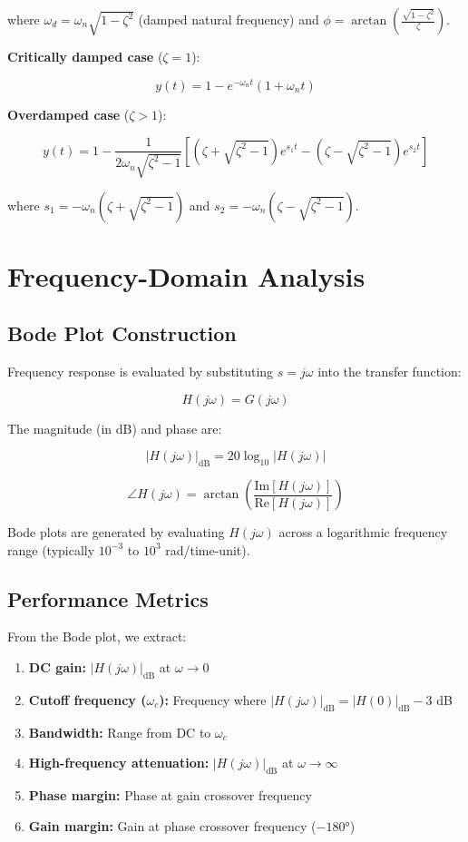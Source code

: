 \documentclass[
]{book}
\providecommand{\tightlist}{%
  \setlength{\itemsep}{0pt}\setlength{\parskip}{0pt}}
\begin{document}
where \(\omega_d = \omega_n\sqrt{1-\zeta^2}\) (damped natural frequency) and \(\phi = \arctan\left(\frac{\sqrt{1-\zeta^2}}{\zeta}\right)\).

\textbf{Critically damped case} (\(\zeta = 1\)):

\[y(t) = 1 - e^{-\omega_n t}(1 + \omega_n t)\]

\textbf{Overdamped case} (\(\zeta > 1\)):

\[y(t) = 1 - \frac{1}{2\omega_n\sqrt{\zeta^2-1}}\left[(\zeta + \sqrt{\zeta^2-1})e^{s_1 t} - (\zeta - \sqrt{\zeta^2-1})e^{s_2 t}\right]\]

where \(s_1 = -\omega_n(\zeta + \sqrt{\zeta^2-1})\) and \(s_2 = -\omega_n(\zeta - \sqrt{\zeta^2-1})\).

\section{Frequency-Domain Analysis}\label{frequency-domain-analysis}

\subsection{Bode Plot Construction}\label{bode-plot-construction}

Frequency response is evaluated by substituting \(s = j\omega\) into the transfer function:

\[H(j\omega) = G(j\omega)\]

The magnitude (in dB) and phase are:

\[|H(j\omega)|_{\text{dB}} = 20\log_{10}|H(j\omega)|\]

\[\angle H(j\omega) = \arctan\left(\frac{\text{Im}[H(j\omega)]}{\text{Re}[H(j\omega)]}\right)\]

Bode plots are generated by evaluating \(H(j\omega)\) across a logarithmic frequency range (typically \(10^{-3}\) to \(10^{3}\) rad/time-unit).

\subsection{Performance Metrics}\label{performance-metrics}

From the Bode plot, we extract:

\begin{enumerate}
\def\labelenumi{\arabic{enumi}.}
\tightlist
\item
  \textbf{DC gain:} \(|H(j\omega)|_{\text{dB}}\) at \(\omega \to 0\)
\item
  \textbf{Cutoff frequency (\(\omega_c\)):} Frequency where \(|H(j\omega)|_{\text{dB}} = |H(0)|_{\text{dB}} - 3\) dB
\item
  \textbf{Bandwidth:} Range from DC to \(\omega_c\)
\item
  \textbf{High-frequency attenuation:} \(|H(j\omega)|_{\text{dB}}\) at \(\omega \to \infty\)
\item
  \textbf{Phase margin:} Phase at gain crossover frequency
\item
  \textbf{Gain margin:} Gain at phase crossover frequency (\(-180°\))
\end{enumerate}
\end{document}
